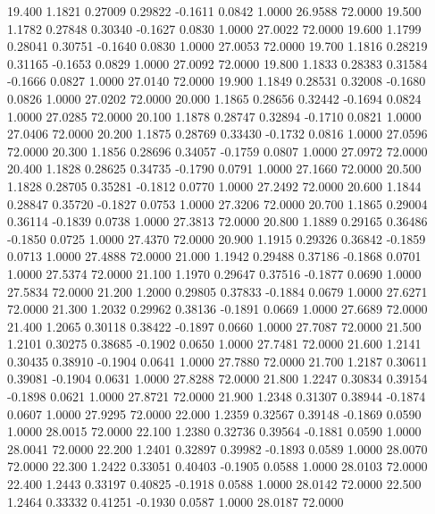   19.400   1.1821   0.27009   0.29822  -0.1611   0.0842   1.0000  26.9588  72.0000
  19.500   1.1782   0.27848   0.30340  -0.1627   0.0830   1.0000  27.0022  72.0000
  19.600   1.1799   0.28041   0.30751  -0.1640   0.0830   1.0000  27.0053  72.0000
  19.700   1.1816   0.28219   0.31165  -0.1653   0.0829   1.0000  27.0092  72.0000
  19.800   1.1833   0.28383   0.31584  -0.1666   0.0827   1.0000  27.0140  72.0000
  19.900   1.1849   0.28531   0.32008  -0.1680   0.0826   1.0000  27.0202  72.0000
  20.000   1.1865   0.28656   0.32442  -0.1694   0.0824   1.0000  27.0285  72.0000
  20.100   1.1878   0.28747   0.32894  -0.1710   0.0821   1.0000  27.0406  72.0000
  20.200   1.1875   0.28769   0.33430  -0.1732   0.0816   1.0000  27.0596  72.0000
  20.300   1.1856   0.28696   0.34057  -0.1759   0.0807   1.0000  27.0972  72.0000
  20.400   1.1828   0.28625   0.34735  -0.1790   0.0791   1.0000  27.1660  72.0000
  20.500   1.1828   0.28705   0.35281  -0.1812   0.0770   1.0000  27.2492  72.0000
  20.600   1.1844   0.28847   0.35720  -0.1827   0.0753   1.0000  27.3206  72.0000
  20.700   1.1865   0.29004   0.36114  -0.1839   0.0738   1.0000  27.3813  72.0000
  20.800   1.1889   0.29165   0.36486  -0.1850   0.0725   1.0000  27.4370  72.0000
  20.900   1.1915   0.29326   0.36842  -0.1859   0.0713   1.0000  27.4888  72.0000
  21.000   1.1942   0.29488   0.37186  -0.1868   0.0701   1.0000  27.5374  72.0000
  21.100   1.1970   0.29647   0.37516  -0.1877   0.0690   1.0000  27.5834  72.0000
  21.200   1.2000   0.29805   0.37833  -0.1884   0.0679   1.0000  27.6271  72.0000
  21.300   1.2032   0.29962   0.38136  -0.1891   0.0669   1.0000  27.6689  72.0000
  21.400   1.2065   0.30118   0.38422  -0.1897   0.0660   1.0000  27.7087  72.0000
  21.500   1.2101   0.30275   0.38685  -0.1902   0.0650   1.0000  27.7481  72.0000
  21.600   1.2141   0.30435   0.38910  -0.1904   0.0641   1.0000  27.7880  72.0000
  21.700   1.2187   0.30611   0.39081  -0.1904   0.0631   1.0000  27.8288  72.0000
  21.800   1.2247   0.30834   0.39154  -0.1898   0.0621   1.0000  27.8721  72.0000
  21.900   1.2348   0.31307   0.38944  -0.1874   0.0607   1.0000  27.9295  72.0000
  22.000   1.2359   0.32567   0.39148  -0.1869   0.0590   1.0000  28.0015  72.0000
  22.100   1.2380   0.32736   0.39564  -0.1881   0.0590   1.0000  28.0041  72.0000
  22.200   1.2401   0.32897   0.39982  -0.1893   0.0589   1.0000  28.0070  72.0000
  22.300   1.2422   0.33051   0.40403  -0.1905   0.0588   1.0000  28.0103  72.0000
  22.400   1.2443   0.33197   0.40825  -0.1918   0.0588   1.0000  28.0142  72.0000
  22.500   1.2464   0.33332   0.41251  -0.1930   0.0587   1.0000  28.0187  72.0000
